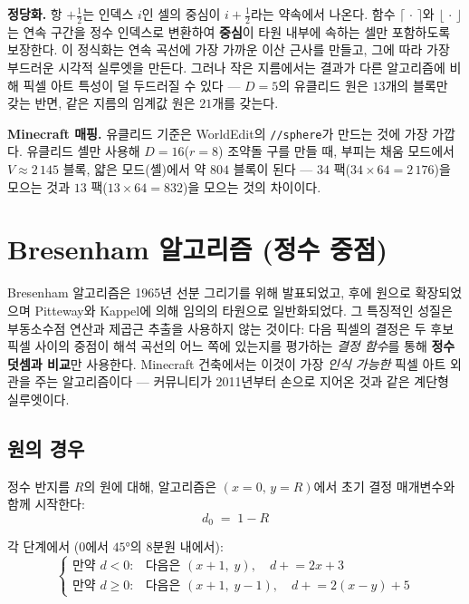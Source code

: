 \documentclass[12pt,a4paper]{scrartcl}
\newcommand{\acc}[1]{\textcolor{accent}{\textbf{#1}}}
\newcommand{\cmd}[1]{\textcolor{earth}{\texttt{\small #1}}}
\begin{document}
\textbf{정당화.} 항 $+\tfrac{1}{2}$는 인덱스 $i$인 셀의 중심이 $i+\tfrac{1}{2}$라는 약속에서 나온다. 함수 $\lceil\,\cdot\,\rceil$와 $\lfloor\,\cdot\,\rfloor$는 연속 구간을 정수 인덱스로 변환하여 \acc{중심}이 타원 내부에 속하는 셀만 포함하도록 보장한다. 이 정식화는 연속 곡선에 가장 가까운 이산 근사를 만들고, 그에 따라 가장 부드러운 시각적 실루엣을 만든다. 그러나 작은 지름에서는 결과가 다른 알고리즘에 비해 픽셀 아트 특성이 덜 두드러질 수 있다 — $D=5$의 유클리드 원은 $13$개의 블록만 갖는 반면, 같은 지름의 임계값 원은 $21$개를 갖는다.

\begin{minec}
\textbf{Minecraft 매핑.} 유클리드 기준은 WorldEdit의 \cmd{//sphere}가 만드는 것에 가장 가깝다. 유클리드 셸만 사용해 $D=16$($r=8$) 조약돌 구를 만들 때, 부피는 채움 모드에서 $V \approx 2\,145$ 블록, 얇은 모드(셸)에서 약 $804$ 블록이 된다 — $34$ 팩($34 \times 64 = 2\,176$)을 모으는 것과 $13$ 팩($13 \times 64 = 832$)을 모으는 것의 차이이다.
\end{minec}

\section{Bresenham 알고리즘 (정수 중점)}

Bresenham 알고리즘은 1965년 선분 그리기를 위해 발표되었고, 후에 원으로 확장되었으며 Pitteway와 Kappel에 의해 임의의 타원으로 일반화되었다. 그 특징적인 성질은 부동소수점 연산과 제곱근 추출을 사용하지 않는 것이다: 다음 픽셀의 결정은 두 후보 픽셀 사이의 중점이 해석 곡선의 어느 쪽에 있는지를 평가하는 \emph{결정 함수}를 통해 \acc{정수 덧셈과 비교}만 사용한다. Minecraft 건축에서는 이것이 가장 \emph{인식 가능한} 픽셀 아트 외관을 주는 알고리즘이다 — 커뮤니티가 2011년부터 손으로 지어온 것과 같은 계단형 실루엣이다.

\subsection{원의 경우}

정수 반지름 $R$의 원에 대해, 알고리즘은 $(x{=}0,\,y{=}R)$에서 초기 결정 매개변수와 함께 시작한다:
\[
d_0 \;=\; 1 - R
\]

각 단계에서 ($0$에서 $45°$의 8분원 내에서):
\[
\begin{cases}
\text{만약 } d < 0: & \text{다음은 } (x{+}1,\;y), \quad d \mathrel{+}= 2x+3 \\[2pt]
\text{만약 } d \geq 0: & \text{다음은 } (x{+}1,\;y{-}1), \quad d \mathrel{+}= 2(x-y)+5
\end{cases}
\]
\end{document}
